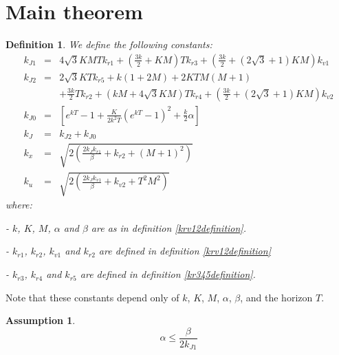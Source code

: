 \documentclass[a4paper,10pt]{article}
\newtheorem{definition}{Definition}
\newtheorem{assumption}{Assumption}
\begin{document}
\section{Main theorem}\label{MainTheoremSection}
\begin{definition}\label{kJdefinition}
   We define the following constants:
    	\begin{eqnarray*}
	   k_{J1}  & = & 
	  4 \sqrt{3}KMTk_{r1}+\left(\frac{3k}{2}+KM\right)Tk_{r3} 
	   +\left(\frac{3k}{2}+(2\sqrt{3}+1)KM\right)k_{v1}
	   \\
	    k_{J2} & = & 2\sqrt{3}KTk_{r5}+k(1+2M)+2KTM(M+1)
	    \\&&
	    +\frac{3k}{2}Tk_{r2} +\left(kM+4\sqrt{3}KM\right)Tk_{r4}
	    +\left(\frac{3k}{2}+(2\sqrt{3}+1)KM\right)k_{v2}
	    \\
	     k_{J0}&=&\left[e^{kT}-1 + \frac{K}{2k^{2}T}\left(e^{kT}-1\right)^{2}
        +\frac{k}{2}\alpha\right]
	\\
	k_{J}& =& k_{J2}+k_{J0}
	\\
	k_{x} & = & \sqrt{2\left(\frac{2k_{J}k_{r1}}{\beta} +k_{r2} + (M+1)^{2}\right)}
	\\
	k_{u} & = & \sqrt{2\left(\frac{2k_{J}k_{v1}}{\beta} +k_{v2} + 
	T^{2}M^{2}\right)}
	\end{eqnarray*}
	where:
	
	- $k$, $K$, $M$, $\alpha$ and $\beta$ are as in definition \ref{krv12definition}.
	
	- $k_{r1}$, $k_{r2}$, $k_{v1}$ and $k_{r2}$ are defined in 
	definition \ref{krv12definition}
	
	- $k_{r3}$, $k_{r4}$ and 
	$k_{r5}$ are defined in definition \ref{kr345definition}.
\end{definition}
Note that these constants depend only of $k$, $K$, $M$, $\alpha$, 
$\beta$, and the horizon  $T$.
\begin{assumption}\label{mainAssumption}
\[
        \alpha \leq \frac{\beta}{2k_{J1}}
\]
\end{assumption}
\end{document}
